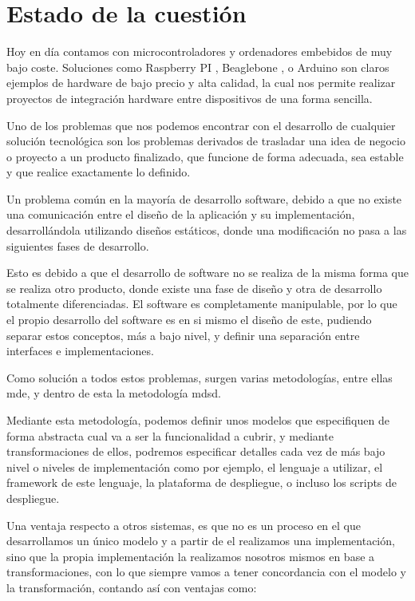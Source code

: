 \chapter{Estado de la cuestión}

Hoy en día contamos con microcontroladores y  ordenadores embebidos de muy bajo coste. Soluciones como Raspberry PI \cite{raspberrypi}, Beaglebone \cite{beaglebone}, o Arduino \cite{arduino} son claros ejemplos de hardware de bajo precio y alta calidad, la cual nos permite realizar proyectos de integración hardware entre dispositivos de una forma sencilla.

Uno de los problemas que nos podemos encontrar con el desarrollo de cualquier solución tecnológica son los problemas derivados de trasladar una idea de negocio o proyecto a un producto finalizado, que funcione de forma adecuada, sea estable y que realice exactamente lo definido.

Un problema común en la mayoría de desarrollo software, debido a que no existe una comunicación entre el diseño de la aplicación y su implementación, desarrollándola utilizando diseños estáticos, donde una modificación no pasa a las siguientes fases de desarrollo.

Esto es debido a que el desarrollo de software no se realiza de la misma forma que se realiza otro producto, donde existe una fase de diseño y otra de desarrollo totalmente diferenciadas. 
El software es completamente manipulable, por lo que el propio desarrollo del software es en si mismo el diseño de este, pudiendo separar estos conceptos, más a bajo nivel, y definir una separación entre interfaces e implementaciones.

Como solución a todos estos problemas, surgen varias metodologías, entre ellas \gls{mde}, y dentro de esta la metodología \gls{mdsd}.

Mediante esta metodología, podemos definir unos modelos que especifiquen de forma abstracta cual va a ser la funcionalidad a cubrir, y mediante transformaciones de ellos, podremos especificar detalles cada vez de más bajo nivel o niveles de implementación como por ejemplo, el lenguaje a utilizar, el \gls{framework} de este lenguaje, la plataforma de despliegue, o incluso los \glspl{script} de despliegue.

Una ventaja respecto a otros sistemas, es que no es un proceso en el que desarrollamos un único modelo y a partir de el realizamos una implementación, sino que la propia implementación la realizamos nosotros mismos en base a transformaciones, con lo que siempre vamos a tener concordancia con el modelo y la transformación, contando así con ventajas como:

